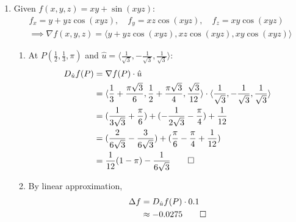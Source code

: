 \documentclass[12pt, a4paper]{article}
\begin{document}
\begin{enumerate}[Q\arabic*.]
  \item Given $f(x,y,z) = xy + \sin (xyz)$:
    \begin{align*}
      f_x = y+yz\cos(xyz),\quad f_y = xz\cos(xyz),\quad f_z = xy\cos(xyz)\\
      \implies \nabla f(x,y,z) = \langle y + yz\cos(xyz), xz\cos(xyz), xy\cos(xyz)\rangle
    \end{align*}
    \begin{enumerate}[(\roman*)]
      \item At $P(\frac{1}{2}, \frac{1}{3}, \pi)$ and $\hat{u} = \langle \frac{1}{\sqrt{3}}, -\frac{1}{\sqrt{3}}, \frac{1}{\sqrt{3}}\rangle$:
        \begin{align*}
          D_{\hat{u}}f(P) &= \nabla f(P) \cdot \hat{u}\\
                          &= \langle \frac{1}{3} + \frac{\pi\sqrt{3}}{6}, \frac{1}{2} + \frac{\pi\sqrt{3}}{4}, \frac{\sqrt{3}}{12}\rangle \cdot \langle \frac{1}{\sqrt{3}}, -\frac{1}{\sqrt{3}}, \frac{1}{\sqrt{3}} \rangle\\
                          &= (\frac{1}{3\sqrt{3}} + \frac{\pi}{6}) + (-\frac{1}{2\sqrt{3}} - \frac{\pi}{4}) + \frac{1}{12}\\
                          &= (\frac{2}{6\sqrt{3}} - \frac{3}{6\sqrt{3}}) + (\frac{\pi}{6} - \frac{\pi}{4} + \frac{1}{12})\\
                          &= \frac{1}{12}(1-\pi) - \frac{1}{6\sqrt{3}} \qed
        \end{align*}

      \item By linear approximation,
        \begin{align*}
          \Delta f &= D_{\hat{u}}f(P) \cdot 0.1\\
                   &\approx -0.0275 \qed
    \end{align*}
    \end{enumerate}


\end{enumerate}
\end{document}
